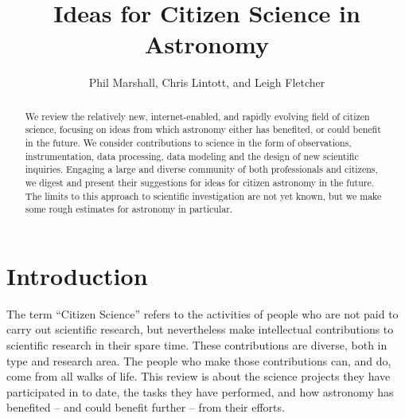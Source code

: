 \documentclass{ar2e}
\begin{document}

\jvol{}
\ARinfo{}

\title{Ideas for Citizen Science in Astronomy}

\author{Phil Marshall,
Chris Lintott, and
Leigh Fletcher
}




\begin{abstract} 

We review the relatively new, internet-enabled, and rapidly evolving field of
citizen science, focusing on ideas from which astronomy either has benefited, or
could benefit in the future. We consider contributions to science in the form of
observations, instrumentation, data processing, data modeling and the design of
new scientific inquiries. Engaging a large and diverse community of both
professionals and citizens, we digest and present their suggestions for ideas
for citizen astronomy in the future. The limits to this approach to scientific
investigation are not yet known, but we make some rough estimates for astronomy
in particular.

\end{abstract}

\maketitle


\section{Introduction}
\label{sec:intro}

The term ``Citizen Science'' refers to the activities of people who are not paid
to carry out scientific research, but nevertheless make intellectual
contributions to scientific research in their spare time. These contributions
are diverse, both in type and research area. The people who make those
contributions can, and do, come from all walks of life. This review is about the
science projects they have participated in to date, the tasks they have
performed, and how astronomy has benefited -- and could benefit further -- from
their efforts.
\end{document}
